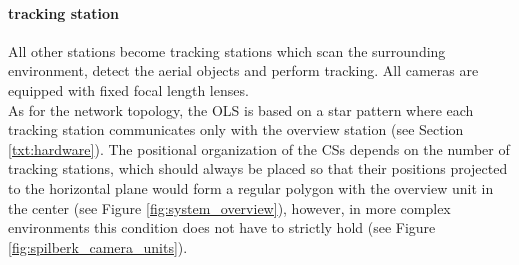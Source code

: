 \paragraph{tracking station} All other stations become tracking stations which scan the surrounding environment, detect the aerial objects and perform tracking. All cameras are equipped with fixed focal length lenses. \\

As for the network topology, the OLS is based on a star pattern where each tracking station communicates only with the overview station (see Section \ref{txt:hardware}). The positional organization of the CSs depends on the number of tracking stations, which should always be placed so that their positions projected to the horizontal plane would form a regular polygon with the overview unit in the center (see Figure \ref{fig:system_overview}), however, in more complex environments this condition does not have to strictly hold (see Figure \ref{fig:spilberk_camera_units}).

